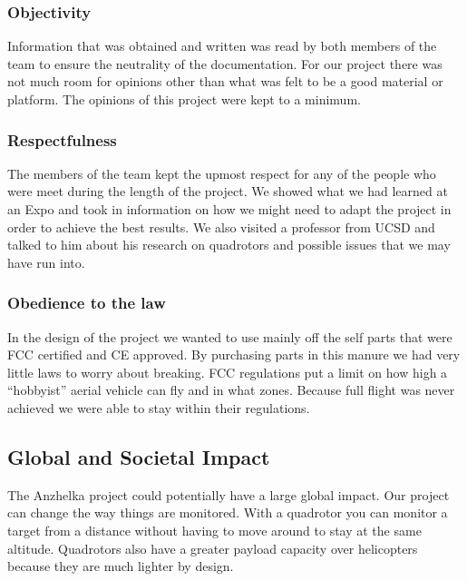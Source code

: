 \documentclass{article}
\numberwithin{equation}{section} %
\begin{document}
\subsubsection{Objectivity}

Information that was obtained and written was read by both members of the team to ensure the neutrality of the documentation. For our project there was not much room for opinions other than what was felt to be a good material or platform. The opinions of this project were kept to a minimum.

\subsubsection{Respectfulness}

The members of the team kept the upmost respect for any of the people who were meet during the length of the project. We showed what we had learned at an Expo and took in information on how we might need to adapt the project in order to achieve the best results. We also visited a professor from UCSD and talked to him about his research on quadrotors and possible issues that we may have run into.

\subsubsection{Obedience to the law}

In the design of the project we wanted to use mainly off the self parts that were FCC certified and CE approved. By purchasing parts in this manure we had very little laws to worry about breaking. FCC regulations put a limit on how high a “hobbyist” aerial vehicle can fly and in what zones. Because full flight was never achieved we were able to stay within their regulations.




\subsection{Global and Societal Impact}
The Anzhelka project could potentially have a large global impact. Our project can change the way things are monitored. With a quadrotor you can monitor a target from a distance without having to move around to stay at the same altitude. Quadrotors also have a greater payload capacity over helicopters because they are much lighter by design.
\end{document}
